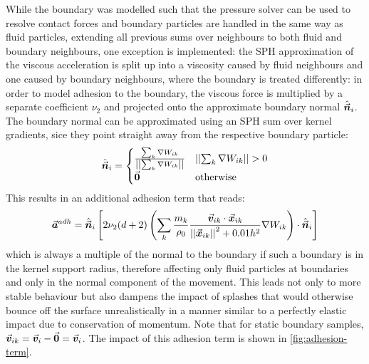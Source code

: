 \horizontalspacer

While the boundary was modelled such that the pressure solver can be used to resolve contact forces and boundary particles are handled in the same way as fluid particles, extending all previous sums over neighbours to both fluid and boundary neighbours, one exception is implemented: the SPH approximation of the viscous acceleration is split up into a viscosity caused by fluid neighbours and one caused by boundary neighbours, where the boundary is treated differently: in order to model adhesion to the boundary, the viscous force is multiplied by a separate coefficient $\nu_2$ and projected onto the approximate boundary normal $\hat{\vec{\bm{n}}}_i$. The boundary normal can be approximated using an SPH sum over kernel gradients, sice they point straight away from the respective boundary particle:
\begin{equation}
  \hat{\vec{\bm{n}}}_i  = \begin{cases}
    \frac{\sum_k \nabla W_{ik}}{\left|\left|\sum_k \nabla W_{ik}\right|\right|} & \left|\left|\sum_k \nabla W_{ik}\right|\right| > 0 \\
    \vec{\bm{0}}                                                  & \text{otherwise}
  \end{cases}
\end{equation}
This results in an additional adhesion term that reads:
\begin{equation}
  \vec{\bm{a}}^{adh}   = \hat{\vec{\bm{n}}}_i \left[2\nu_2(d+2) \left(\sum_k\frac{m_k}{\rho_0} \frac{\vec{\bm{v}}_{ik}\cdot\vec{\bm{x}}_{ik}}{\left|\left|\vec{\bm{x}}_{ik}\right|\right|^2 + 0.01h^2}\nabla W_{ik}\right)\cdot \hat{\vec{\bm{n}}}_i \right]
\end{equation}
which is always a multiple of the normal to the boundary if such a boundary is in the kernel support radius, therefore affecting only fluid particles at boundaries and only in the normal component of the movement. This leads not only to more stable behaviour but also dampens the impact of splashes that would otherwise bounce off the surface unrealistically in a manner similar to a perfectly elastic impact due to conservation of momentum. Note that for static boundary samples, $\vec{\bm{v}}_{ik} = \vec{\bm{v}}_i - \vec{\bm{0}} = \vec{\bm{v}}_i$. The impact of this adhesion term is shown in \autoref{fig:adhesion-term}.


